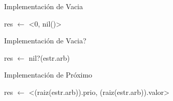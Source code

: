 \begin{Algoritmos}

\begin{algorithm}
\caption{Implementaci\'on de Vacia}
\begin{algorithmic}[0]
\State res $\gets$ <0, nil()> 
\EndFunction
\end{algorithmic}
\end{algorithm}

\begin{algorithm}
\caption{Implementaci\'on de Vacia?}
\begin{algorithmic}[0]
\State res $\gets$ nil?(estr.arb) 
\EndFunction
\end{algorithmic}
\end{algorithm}

\begin{algorithm}
\caption{Implementaci\'on de Pr\'oximo}
\begin{algorithmic}[0]
\State res $\gets$ <(raiz(estr.arb)).prio, (raiz(estr.arb)).valor> 
\EndFunction
\end{algorithmic}
\end{algorithm}


\end{Algoritmos}
